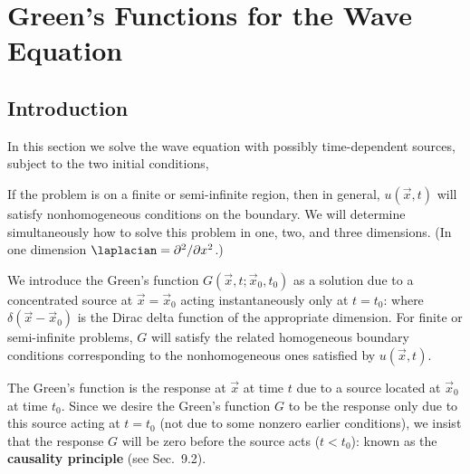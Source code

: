\section{Green's Functions for the Wave Equation}
\label{sec:greens-wave}

\subsection{Introduction}
\label{subsec:wave-green-intro}

In this section we solve the wave equation with possibly time-dependent sources,
subject to the two initial conditions,

If the problem is on a finite or semi-infinite region, then in general, $u(\vec{x},t)$ will satisfy nonhomogeneous conditions on the boundary.  We will determine simultaneously how to solve this problem in one, two, and three dimensions.  (In one dimension $\laplacian = \partial^2/\partial x^2$.)

We introduce the Green's function $G(\vec{x},t;\vec{x}_0,t_0)$ as a solution due to a concentrated source at $\vec{x} = \vec{x}_0$ acting instantaneously only at $t = t_0$:
where $\delta(\vec{x} - \vec{x}_0)$ is the Dirac delta function of the appropriate dimension.  For finite or semi-infinite problems, $G$ will satisfy the related homogeneous boundary conditions corresponding to the nonhomogeneous ones satisfied by $u(\vec{x},t)$.

The Green's function is the response at $\vec{x}$ at time $t$ due to a source located at $\vec{x}_0$ at time $t_0$.  Since we desire the Green's function $G$ to be the response only due to this source acting at $t = t_0$ (not due to some nonzero earlier conditions), we insist that the response $G$ will be zero before the source acts ($t < t_0$):
known as the \textbf{causality principle} (see Sec.~9.2).

